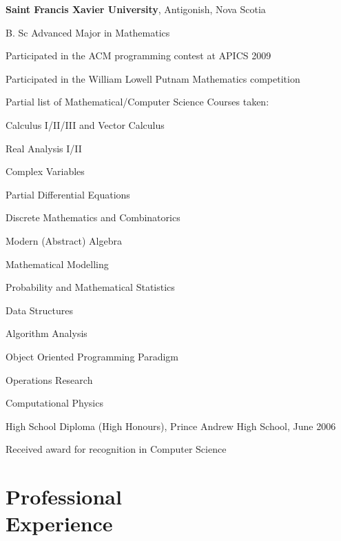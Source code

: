 \documentclass[margin,line]{resume}
\begin{document}
\begin{resume}
	{\bf Saint Francis Xavier University}, Antigonish, Nova Scotia \vspace{2mm}%
	\begin{list1}
		\item[] B. Sc Advanced Major in Mathematics
		\begin{list2}
			\vspace*{1mm}
			\item Participated in the ACM programming contest at APICS 2009
			\item Participated in the William Lowell Putnam Mathematics competition 
		\end{list2}
		\item[] Partial list of Mathematical/Computer Science Courses taken:
		\begin{list2}
			\vspace*{1mm}
			\item Calculus I/II/III and Vector Calculus
			\item Real Analysis I/II
			\item Complex Variables
			\item Partial Differential Equations
			\item Discrete Mathematics and Combinatorics
			\item Modern (Abstract) Algebra
			\item Mathematical Modelling
			\item Probability and Mathematical Statistics
			\item Data Structures
			\item Algorithm Analysis
			\item Object Oriented Programming Paradigm
			\item Operations Research
			\item Computational Physics
		\end{list2}
		\vspace*{2mm}
		\item[] High School Diploma (High Honours), Prince Andrew High School, June 2006
		\begin{list2}
			\vspace*{1mm}
		\item Received award for recognition in Computer Science
	\end{list2}
	\end{list1}

	\section{\mysidestyle Professional\\Experience}


\end{resume}
\end{document}
